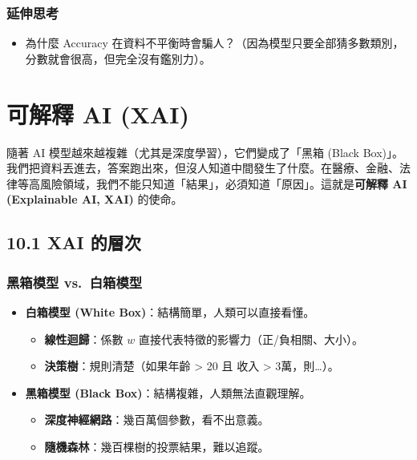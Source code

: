 \documentclass[
  letterpaper,
  DIV=11,
  numbers=noendperiod]{scrreprt}
\providecommand{\tightlist}{%
  \setlength{\itemsep}{0pt}\setlength{\parskip}{0pt}}
\begin{document}
\section{延伸思考}\label{ux5ef6ux4f38ux601dux8003-8}

\begin{itemize}
\tightlist
\item
  為什麼 Accuracy
  在資料不平衡時會騙人？（因為模型只要全部猜多數類別，分數就會很高，但完全沒有鑑別力）。
\end{itemize}

\part{可解釋 AI (XAI)}\label{ux53efux89e3ux91cb-ai-xai}

隨著 AI 模型越來越複雜（尤其是深度學習），它們變成了「黑箱 (Black
Box)」。我們把資料丟進去，答案跑出來，但沒人知道中間發生了什麼。在醫療、金融、法律等高風險領域，我們不能只知道「結果」，必須知道「原因」。這就是\textbf{可解釋
AI (Explainable AI, XAI)} 的使命。

\chapter{10.1 XAI 的層次}\label{sec-xai-levels}

\section{黑箱模型 vs.~白箱模型}\label{sec-black-white-box}

\begin{itemize}
\tightlist
\item
  \textbf{白箱模型 (White Box)}：結構簡單，人類可以直接看懂。

  \begin{itemize}
  \tightlist
  \item
    \textbf{線性迴歸}：係數 \(w\)
    直接代表特徵的影響力（正/負相關、大小）。
  \item
    \textbf{決策樹}：規則清楚（如果年齡 \textgreater{} 20 且 收入
    \textgreater{} 3萬，則\ldots）。
  \end{itemize}
\item
  \textbf{黑箱模型 (Black Box)}：結構複雜，人類無法直觀理解。

  \begin{itemize}
  \tightlist
  \item
    \textbf{深度神經網路}：幾百萬個參數，看不出意義。
  \item
    \textbf{隨機森林}：幾百棵樹的投票結果，難以追蹤。
  \end{itemize}
\end{itemize}
\end{document}
